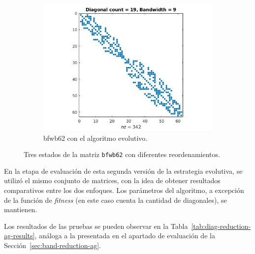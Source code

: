 \begin{figure}
\begin{subfigure}[t]{.3\textwidth}
  \includegraphics[width=\linewidth]{imagenes/chap4/bfwb62_ga_spy_.jpg}
  \caption{bfwb62 con el algoritmo evolutivo.}
  \label{fig:bfwb62_ga_spy-diag}
\end{subfigure}
\caption{Tres estados de la matriz \texttt{bfwb62} con diferentes reordenamientos.}
\label{fig:bfwb62-diag}
\end{figure}



En la etapa de evaluación de esta segunda versión de la estrategia evolutiva, se utilizó el mismo conjunto de  matrices, con la idea de obtener resultados comparativos entre los dos enfoques. Los parámetros del algoritmo, a excepción de la función de \textit{fitness} (en este caso cuenta la cantidad de diagonales), se mantienen.

Los resultados de las pruebas se pueden observar en la Tabla~\ref{tab:diag-reduction-ag-results}, análoga a la presentada en el apartado de evaluación de la Sección~\ref{sec:band-reduction-ag}.


